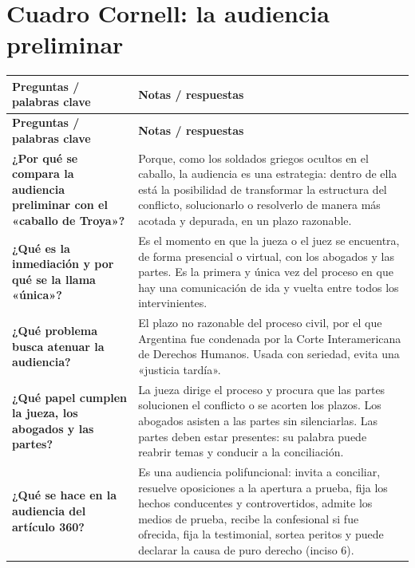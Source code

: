 \documentclass[12pt,oneside]{book}
\begin{document}
\section{Cuadro Cornell: la audiencia preliminar}

\begingroup
\small
\begin{longtable}{
    >{\raggedright\arraybackslash}p{}
    >{\raggedright\arraybackslash}p{}
}
\toprule
\textbf{Preguntas / palabras clave} & \textbf{Notas / respuestas} \\
\midrule
\endfirsthead
\toprule
\textbf{Preguntas / palabras clave} & \textbf{Notas / respuestas} \\
\midrule
\endhead
\bottomrule
\endfoot
\textbf{¿Por qué se compara la audiencia preliminar con el «caballo de Troya»?} &
Porque, como los soldados griegos ocultos en el caballo, la audiencia es una estrategia: dentro de ella está la posibilidad de transformar la estructura del conflicto, solucionarlo o resolverlo de manera más acotada y depurada, en un plazo razonable. \\[0.6em]

\textbf{¿Qué es la inmediación y por qué se la llama «única»?} &
Es el momento en que la jueza o el juez se encuentra, de forma presencial o virtual, con los abogados y las partes. Es la primera y única vez del proceso en que hay una comunicación de ida y vuelta entre todos los intervinientes. \\[0.6em]

\textbf{¿Qué problema busca atenuar la audiencia?} &
El plazo no razonable del proceso civil, por el que Argentina fue condenada por la Corte Interamericana de Derechos Humanos. Usada con seriedad, evita una «justicia tardía». \\[0.6em]

\textbf{¿Qué papel cumplen la jueza, los abogados y las partes?} &
La jueza dirige el proceso y procura que las partes solucionen el conflicto o se acorten los plazos. Los abogados asisten a las partes sin silenciarlas. Las partes deben estar presentes: su palabra puede reabrir temas y conducir a la conciliación. \\[0.6em]

\textbf{¿Qué se hace en la audiencia del artículo 360?} &
Es una audiencia polifuncional: invita a conciliar, resuelve oposiciones a la apertura a prueba, fija los hechos conducentes y controvertidos, admite los medios de prueba, recibe la confesional si fue ofrecida, fija la testimonial, sortea peritos y puede declarar la causa de puro derecho (inciso 6). \\[0.6em]


\end{longtable}
\end{document}
